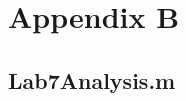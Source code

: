 \chapter{Appendix B}

\section{Lab7Analysis.m} \label{sec:analysis_code}

\inputminted{matlab}{Code/Lab7Analysis.m}\label{listing:data_analysis_script}